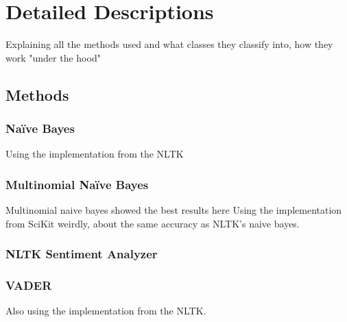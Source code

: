 \chapter{Detailed Descriptions}
\label{chapter:DetailedDescriptions}\label{sentimentanalysis}


Explaining all the methods used and what classes they classify into, how they work "under the hood"

\section{Methods}
\label{sec:methods}

\subsection{Na\"{i}ve Bayes}
\label{subsec:naivebayes}

Using the implementation from the NLTK

\subsection{Multinomial Na\"{i}ve Bayes}
\label{subsec:multinomialnaivebayes}

Multinomial naive bayes showed the best results here \cite{Go2009}
Using the implementation from SciKit
weirdly, about the same accuracy as NLTK's naive bayes.

\subsection{NLTK Sentiment Analyzer}
\label{subsec:nltksentimentanalyzer}

\subsection{VADER}
\label{subsec:vader}

Also using the implementation from the NLTK.
\cite{Hutto2014}

